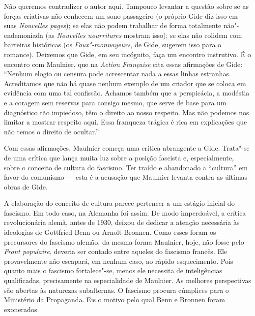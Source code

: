 Não queremos contradizer o autor aqui. Tampouco levantar a questão sobre
se as forças criativas não conhecem um sono passageiro (o próprio Gide
diz isso em suas \emph{Nouvelles pages}); se elas não podem trabalhar de
forma totalmente não"-endemoniada (as \emph{Nouvelles nourritures}
mostram isso); se elas não colidem com barreiras históricas (os
\emph{Faux"-monnayeurs}, de Gide, sugerem isso para o romance). Deixemos
que Gide, em seu incógnito, faça um encontro instrutivo. É o encontro
com Maulnier, que na \emph{Action Française} cita essas afirmações de
Gide: ``Nenhum elogio ou censura pode acrescentar nada a essas linhas
estranhas. Acreditamos que não há quase nenhum exemplo de um criador
que se coloca em evidência com uma tal confissão. Achamos também que a
perspicácia, a modéstia e a coragem sem reservas para consigo mesmo, que
serve de base para um diagnóstico tão impiedoso, têm o direito ao nosso
respeito. Mas não podemos nos limitar a mostrar respeito aqui. Essa
franqueza trágica é rica em explicações que não temos o direito de
ocultar.''

Com essas afirmações, Maulnier começa uma crítica abrangente a Gide. Trata"-se de
uma crítica que lança muita luz sobre a posição fascista e,
especialmente, sobre o conceito de cultura do fascismo. Ter traído e
abandonado a ``cultura'' em favor do comunismo --- esta é a acusação que
Maulnier levanta contra as últimas obras de Gide.

A elaboração do conceito de cultura parece pertencer a um estágio
inicial do fascismo. Em todo caso, na Alemanha foi assim. De modo
imperdoável, a crítica revolucionária alemã, antes de 1930, deixou de
dedicar a atenção necessária às ideologias de Gottfried Benn ou Arnolt
Bronnen. Como esses foram os precursores do fascismo alemão, da mesma
forma Maulnier, hoje, não fosse pelo \emph{Front populaire}, deveria ser
contado entre aqueles do fascismo francês. Ele provavelmente não
escapará, em nenhum caso, ao rápido esquecimento. Pois quanto mais o
fascismo fortalece"-se, menos ele necessita de inteligências
qualificadas, precisamente na especialidade de Maulnier. As melhores
perspectivas são abertas às naturezas subalternas. O fascismo procura
cúmplices para o Ministério da Propaganda. Eis o motivo pelo qual Benn e Bronnen
foram exonerados.

